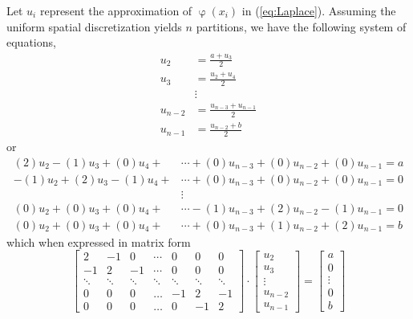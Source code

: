 \documentclass[../main.tex]{subfiles}
\begin{document}
Let $u_i$ represent the approximation of $\upvarphi (x_i)$ in (\ref{eq:Laplace}). Assuming the uniform spatial discretization yields $n$ partitions, we have the following system of equations,
\begin{align}
u_2 &= \frac{a + u_3}{2}\nonumber\\
u_3 &= \frac{u_2 + u_4}{2}\nonumber\\
&\vdots\\
u_{n-2} &= \frac{u_{n-3} + u_{n-1}}{2}\nonumber\\
u_{n-1} &= \frac{u_{n-2} + b}{2}\nonumber
\end{align}
or
\begin{align*}
 (2)u_2 - (1)u_3 + (0)u_4 + & \cdots + (0)u_{n-3} + (0)u_{n-2} + (0)u_{n-1} = a\\
-(1)u_2 + (2)u_3 - (1)u_4 + & \cdots + (0)u_{n-3} + (0)u_{n-2} + (0)u_{n-1} = 0\\
& \vdots\\ 
 (0)u_2 + (0)u_3 + (0)u_4 + & \cdots - (1)u_{n-3} + (2)u_{n-2} - (1)u_{n-1} = 0\\
 (0)u_2 + (0)u_3 + (0)u_4 + & \cdots + (0)u_{n-3} + (1)u_{n-2} + (2)u_{n-1} = b
\end{align*}
which when expressed in matrix form 
\[
\begin{bmatrix}
    2		&	-1		&	0		&	\cdots	&0&	0		&	0\\
    -1		&	2		&	-1		&	\cdots	&0&	0		&	0\\
    \ddots	&	\ddots	&	\ddots	&	\ddots	&\ddots&	\ddots	&	\ddots\\
    0		&	0		&	0		&	\hdots	&-1&	2		&	-1\\
    0		&	0		&	0		&	\hdots	&0&	-1		&	2
\end{bmatrix}
\cdot
\begin{bmatrix}
    u_2\\u_3\\\vdots\\u_{n-2}\\u_{n-1}
\end{bmatrix}
=
\begin{bmatrix}
a\\0\\\vdots\\0\\b
\end{bmatrix}
\]

\end{document}

